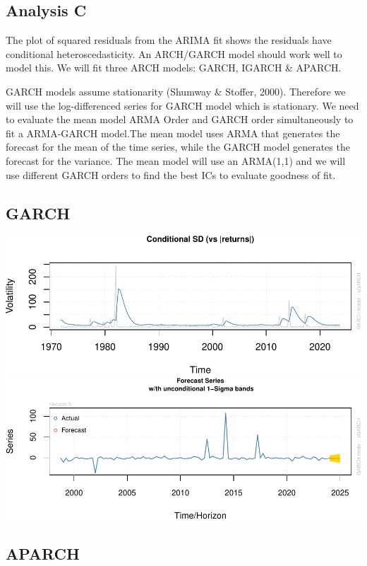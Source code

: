 \documentclass[
  man]{apa6}
\begin{document}
\subsection{Analysis C}\label{analysis-c}

The plot of squared residuals from the ARIMA fit shows the residuals have conditional heteroscedasticity. An ARCH/GARCH model should work well to model this. We will fit three ARCH models: GARCH, IGARCH \& APARCH.

GARCH models assume stationarity (Shumway \& Stoffer, 2000). Therefore we will use the log-differenced series for GARCH model which is stationary. We need to evaluate the mean model ARMA Order and GARCH order simultaneously to fit a ARMA-GARCH model.The mean model uses ARMA that generates the forecast for the mean of the time series, while the GARCH model generates the forecast for the variance. The mean model will use an ARMA(1,1) and we will use different GARCH orders to find the best ICs to evaluate goodness of fit.

\subsection{GARCH}\label{garch}

\includegraphics{STAT429Report_files/figure-latex/unnamed-chunk-17-1.pdf} \includegraphics{STAT429Report_files/figure-latex/unnamed-chunk-17-2.pdf}

\subsection{APARCH}\label{aparch}
\end{document}
